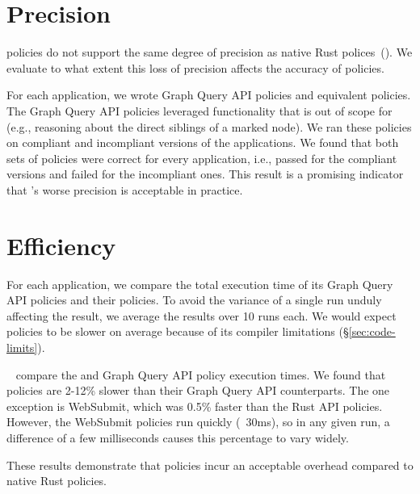 \section{Precision}
\label{sec:precision}
\syslang{} policies do not support the same degree of precision as native Rust polices~().
%
We evaluate to what extent this loss of precision affects the accuracy of \syslang{} policies.

For each application, we wrote Graph Query API policies and equivalent \syslang{} policies.
%
The Graph Query API policies leveraged functionality that is out of scope for \syslang{}
(e.g., reasoning about the direct siblings of a marked node).
%
We ran these policies on compliant and incompliant versions of the applications.
%
We found that both sets of policies were correct for every application,
i.e., passed for the compliant versions and failed for the incompliant ones.
%
This result is a promising indicator that \syslang's worse precision is acceptable in practice.

\section{Efficiency}
\label{sec:efficiency}
For each application, we compare the total execution time of its Graph Query API policies
and their \syslang{} policies.
%
To avoid the variance of a single run unduly affecting the result, we average the results over 10 runs each.
%
We would expect \syslang{} policies to be slower on average because of its compiler limitations (\S\ref{sec:code-limits}).

~ compare the \syslang{} and Graph Query API policy execution times.
%
We found that \syslang{} policies are 2-12\% slower than their Graph Query API counterparts.
%
The one exception is WebSubmit, which was 0.5\% faster than the Rust API policies.
%
However, the WebSubmit policies run quickly (~30ms),
so in any given run, a difference of a few milliseconds causes this percentage to vary widely.

These results demonstrate that \syslang{} policies incur an acceptable overhead compared to native Rust policies.

